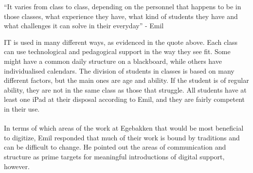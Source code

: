 \begin{displayquote}
    ``It varies from class to class, depending on the personnel that happens to be in those classes, what experience they have, what kind of students they have and what challenges it can solve in their everyday'' - Emil
\end{displayquote}
IT is used in many different ways, as evidenced in the quote above. 
Each class can use technological and pedagogical support in the way they see fit.
Some might have a common daily structure on a blackboard, while others have individualised calendars.
The division of students in classes is based on many different factors, but the main ones are age and ability. 
If the student is of regular ability, they are not in the same class as those that struggle.
All students have at least one iPad at their disposal according to Emil, and they are fairly competent in their use.
\\\\
In terms of which areas of the work at Egebakken that would be most beneficial to digitize, Emil responded that much of their work is bound by traditions and can be difficult to change.
He pointed out the areas of communication and structure as prime targets for meaningful introductions of digital support, however. 

